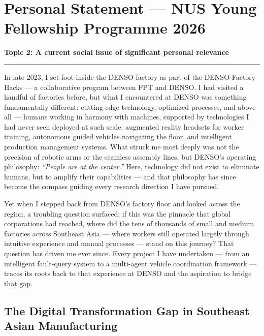 \documentclass[
  12pt,
]{article}
\author{}
\date{}
\begin{document}
\hypertarget{personal-statement-nus-young-fellowship-programme-2026}{%
\section{Personal Statement — NUS Young Fellowship Programme
2026}\label{personal-statement-nus-young-fellowship-programme-2026}}

\textbf{Topic 2: A current social issue of significant personal
relevance}

\begin{center}\rule{0.5\linewidth}{0.5pt}\end{center}

In late 2023, I set foot inside the DENSO factory as part of the DENSO
Factory Hacks — a collaborative program between FPT and DENSO. I had
visited a handful of factories before, but what I encountered at DENSO
was something fundamentally different: cutting-edge technology,
optimized processes, and above all — humans working in harmony with
machines, supported by technologies I had never seen deployed at such
scale: augmented reality headsets for worker training, autonomous guided
vehicles navigating the floor, and intelligent production management
systems. What struck me most deeply was not the precision of robotic
arms or the seamless assembly lines, but DENSO’s operating philosophy:
\emph{“People are at the center.”} Here, technology did not exist to
eliminate humans, but to amplify their capabilities — and that
philosophy has since become the compass guiding every research direction
I have pursued.

Yet when I stepped back from DENSO’s factory floor and looked across the
region, a troubling question surfaced: if this was the pinnacle that
global corporations had reached, where did the tens of thousands of
small and medium factories across Southeast Asia — where workers still
operated largely through intuitive experience and manual processes —
stand on this journey? That question has driven me ever since. Every
project I have undertaken — from an intelligent fault-query system to a
multi-agent vehicle coordination framework — traces its roots back to
that experience at DENSO and the aspiration to bridge that gap.

\hypertarget{the-digital-transformation-gap-in-southeast-asian-manufacturing}{%
\subsection{The Digital Transformation Gap in Southeast Asian
Manufacturing}\label{the-digital-transformation-gap-in-southeast-asian-manufacturing}}
\end{document}

